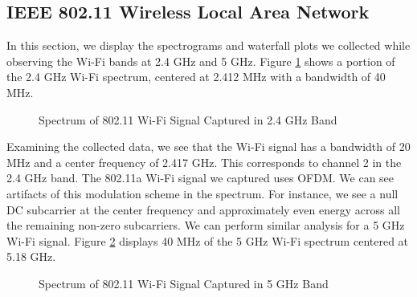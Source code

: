 \documentclass{article}
\begin{document}
\subsection{IEEE 802.11 Wireless Local Area Network}

In this section, we display the spectrograms and waterfall plots we collected while observing the Wi-Fi bands at 2.4 GHz and 5 GHz. Figure \ref{fig::2_412_wifi_spectrum} shows a portion of the 2.4 GHz Wi-Fi spectrum, centered at 2.412 MHz with a bandwidth of 40 MHz.

\begin{figure}[H]
	\centerline{}
	\caption{Spectrum of 802.11 Wi-Fi Signal Captured in 2.4 GHz Band}
	\label{fig::2_412_wifi_spectrum}
\end{figure}

Examining the collected data, we see that the Wi-Fi signal has a bandwidth of 20 MHz and a center frequency of 2.417 GHz. This corresponds to channel 2 in the 2.4 GHz band. The 802.11a Wi-Fi signal we captured uses OFDM. We can see artifacts of this modulation scheme in the spectrum. For instance, we see a null DC subcarrier at the center frequency and approximately even energy across all the remaining non-zero subcarriers. We can perform similar analysis for a 5 GHz Wi-Fi signal. Figure \ref{fig::5_180g_wifi_spectrum} displays 40 MHz of the 5 GHz Wi-Fi spectrum centered at 5.18 GHz.

\begin{figure}[H]
	\centerline{}
	\caption{Spectrum of 802.11 Wi-Fi Signal Captured in 5 GHz Band}
	\label{fig::5_180g_wifi_spectrum}
\end{figure}
\end{document}
